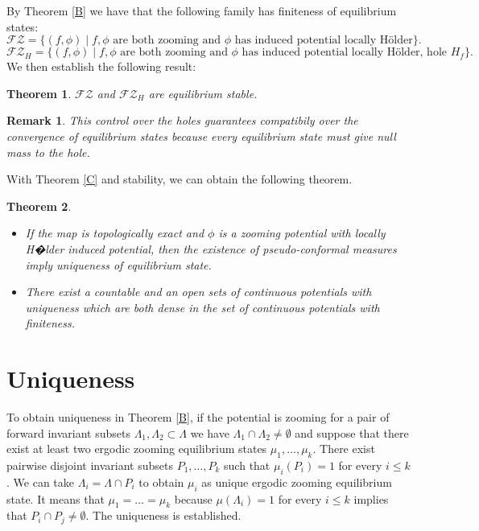 \documentclass[12pt,a4paper]{amsart}
\theoremstyle{plain}
\newtheorem{remark}{Remark}[subsection]
\newtheorem{theorema}{Theorem}
\begin{document}
By Theorem \ref{B} we have that the following family has finiteness of equilibrium states:
\[
\mathcal{FZ} = \{(f,\phi) \mid f,\phi \,\, \text{are both zooming  and} \,\, \phi \,\, \text{has induced potential locally H\"older} \}.
\]
\[
\mathcal{FZ}_{H} = \{(f,\phi) \mid f,\phi \,\, \text{are both zooming  and} \,\, \phi \,\, \text{has induced potential locally H\"older, hole} \,\, H_{f} \}.
\]
We then establish the following result:

\begin{theorema}
	\label{D}
	$\mathcal{FZ}$ and $\mathcal{FZ}_{H}$ are equilibrium stable. 
\end{theorema}

\begin{remark}
	This control over the holes guarantees compatibily over the convergence of equilibrium states because every equilibrium state must give null mass to the hole.
\end{remark}

With Theorem \ref{C} and stability, we can obtain the following theorem.

\begin{theorema}\label{F}
	\begin{itemize} In the context of Theorems \ref{B} and \ref{C}, we have
		\item If the map is topologically exact and $\phi$ is a zooming potential with locally H�lder induced potential, then the existence of pseudo-conformal measures imply uniqueness of equilibrium state.
		
		\item There exist a countable and an open sets of continuous potentials with uniqueness which are both dense in the set of continuous potentials with finiteness.
	\end{itemize}
\end{theorema}

\section{Uniqueness}\label{Uniqueness}

To obtain uniqueness in Theorem \ref{B}, if the potential is zooming for a pair of forward invariant subsets $\Lambda_{1}, \Lambda_{2} \subset \Lambda$ we have $\Lambda_{1}\cap \Lambda_{2} \neq \emptyset$ and suppose that there exist at least two ergodic zooming equilibrium states $\mu_{1}, \dots, \mu_{k}$. There exist pairwise disjoint invariant subsets $P_{1},\dots, P_{k}$ such that $\mu_{i}(P_{i}) = 1$ for every $i \leq k$. We can take $\Lambda_{i} = \Lambda \cap P_{i}$ to obtain $\mu_{i}$ as unique ergodic zooming equilibrium state. It means that $\mu_{1} = \dots = \mu_{k}$ because $\mu(\Lambda_{i}) = 1$ for every $i \leq k$ implies that $P_{i} \cap P_{j} \neq \emptyset$. The uniqueness is established.
\end{document}
